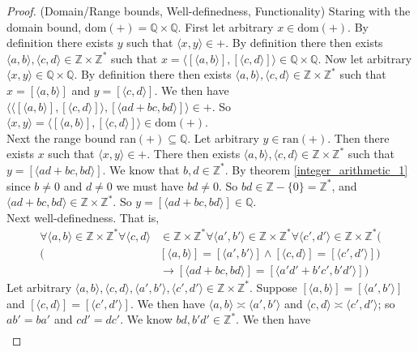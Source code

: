 \documentclass{report}
\begin{document}
\begin{proof}(Domain/Range bounds, Well-definedness, Functionality) Staring with the domain bound, dom$(+)=\mathbb Q\times\mathbb Q$. First let arbitrary $x\in\text{dom}(+)$. By definition there 
exists $y$ such that $\langle x,y\rangle\in+$.
By definition there then exists $\langle a,b\rangle,\langle c,d\rangle\in\mathbb Z\times\mathbb Z^*$ such that $x=\langle[\langle a,b\rangle],[\langle c,d\rangle]\rangle\in\mathbb Q\times\mathbb Q$.
Now let arbitrary $\langle x,y\rangle\in\mathbb Q\times\mathbb Q$. By definition there then exists $\langle a,b\rangle,\langle c,d\rangle\in\mathbb Z\times\mathbb Z^*$ such that $x=[\langle a,b\rangle]$
and $y=[\langle c,d\rangle]$.
We then have $\langle\langle[\langle a,b\rangle],[\langle c,d\rangle]\rangle,[\langle ad+bc,bd\rangle]\rangle\in+$. 
So $\langle x,y\rangle=\langle[\langle a,b\rangle],[\langle c,d\rangle]\rangle\in\text{dom}(+)$.\\
\indent Next the range bound ran$(+)\subseteq\mathbb Q$. Let arbitrary $y\in\text{ran}(+)$. Then there exists $x$ such that $\langle x,y\rangle\in+$. 
There then exists $\langle a,b\rangle,\langle c,d\rangle\in\mathbb Z\times\mathbb Z^*$ such that 
$y=[\langle ad+bc,bd\rangle]$.
We know that $b,d\in\mathbb Z^*$. By theorem \ref{integer_arithmetic_1} since $b\neq0$ and $d\neq0$ we must have $bd\neq0$.
So $bd\in\mathbb Z-\{0\}=\mathbb Z^*$, and $\langle ad+bc,bd\rangle\in\mathbb Z\times\mathbb Z^*$.
So $y=[\langle ad+bc,bd\rangle]\in\mathbb Q$.\\
\indent Next well-definedness. That is,
\begin{align*}
\forall\langle a,b\rangle\in\mathbb Z\times\mathbb Z^*\forall\langle c,d\rangle&\in\mathbb Z\times\mathbb Z^*\forall\langle a',b'\rangle\in\mathbb Z\times\mathbb Z^*\forall\langle c',d'\rangle\in\mathbb Z\times\mathbb Z^*(\\
(&[\langle a,b\rangle]=[\langle a',b'\rangle]\land[\langle c,d\rangle]=[\langle c',d'\rangle])\\
&\to[\langle ad+bc,bd\rangle]=[\langle a'd'+b'c',b'd'\rangle])
\end{align*}    
Let arbitrary $\langle a,b\rangle,\langle c,d\rangle,\langle a',b'\rangle,\langle c',d'\rangle\in\mathbb Z\times\mathbb Z^*$.
Suppose $[\langle a,b\rangle]=[\langle a',b'\rangle]$ and $[\langle c,d\rangle]=[\langle c',d'\rangle]$. We then have $\langle a,b\rangle\asymp\langle a',b'\rangle$ and $\langle c,d\rangle\asymp\langle c',d'\rangle$; so $ab'=ba'$ and $cd'=dc'$. We know $bd,b'd'\in\mathbb Z^*$.
We then have
\begin{align*}

\end{align*}
\end{proof}
\end{document}
